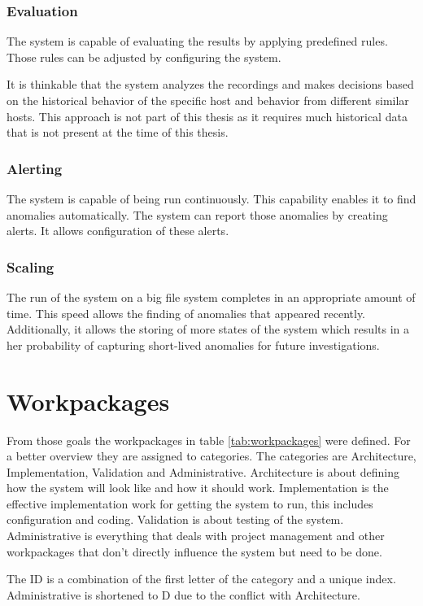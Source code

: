 \subsubsection{Evaluation}
The system is capable of evaluating the results by applying predefined rules. Those rules can be adjusted by configuring the system.

It is thinkable that the system analyzes the recordings and makes decisions based on the historical behavior of the specific host and behavior from different similar hosts. This approach is not part of this thesis as it requires much historical data that is not present at the time of this thesis. 

\subsubsection{Alerting}
The system is capable of being run continuously. This capability enables it to find anomalies automatically. The system can report those anomalies by creating alerts. It allows configuration of these alerts.

\subsubsection{Scaling}
The run of the system on a big file system completes in an appropriate amount of time. This speed allows the finding of anomalies that appeared recently. Additionally, it allows the storing of more states of the system which results in a her probability of capturing short-lived anomalies for future investigations. 

\section{Workpackages}

From those goals the workpackages in table \ref{tab:workpackages} were defined. For a better overview they are assigned to categories. The categories are Architecture, Implementation, Validation and Administrative. Architecture is about defining how the system will look like and how it should work. Implementation is the effective implementation work for getting the system to run, this includes configuration and coding. Validation is about testing of the system. Administrative is everything that deals with project management and other workpackages that don't directly influence the system but need to be done.

The ID is a combination of the first letter of the category and a unique index. Administrative is shortened to D due to the conflict with Architecture.

